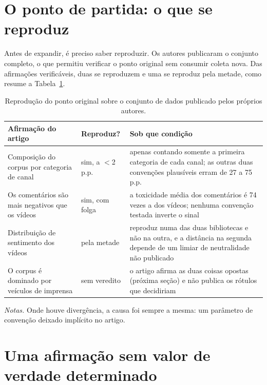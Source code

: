 \section{O ponto de partida: o que se reproduz}

Antes de expandir, é preciso saber reproduzir. Os autores publicaram o conjunto
completo, o que permitiu verificar o ponto original sem consumir coleta nova. Das
afirmações verificáveis, duas se reproduzem e uma se reproduz pela metade, como
resume a Tabela~\ref{tab:youtube-ponto}.

\begin{table}[htbp]
\centering\footnotesize
\caption[Reprodução do ponto original sobre os dados publicados pelos
autores]{Reprodução do ponto original sobre o conjunto de dados publicado pelos
próprios autores.}
\label{tab:youtube-ponto}
\begin{tabularx}{\textwidth}{@{}>{\raggedright\arraybackslash}p{4.2cm}>{\raggedright\arraybackslash}p{2.2cm}X@{}}
\toprule
Afirmação do artigo & Reproduz? & Sob que condição \\
\midrule
Composição do corpus por categoria de canal & sim, a $<$2 p.p. & apenas contando somente a primeira categoria de cada canal; as outras duas convenções plausíveis erram de 27 a 75 p.p. \\
\addlinespace[2pt]
Os comentários são mais negativos que os vídeos & sim, com folga & a toxicidade média dos comentários é 74 vezes a dos vídeos; nenhuma convenção testada inverte o sinal \\
\addlinespace[2pt]
Distribuição de sentimento dos vídeos & pela metade & reproduz numa das duas bibliotecas e não na outra, e a distância na segunda depende de um limiar de neutralidade não publicado \\
\addlinespace[2pt]
O corpus é dominado por veículos de imprensa & sem veredito & o artigo afirma as duas coisas opostas (próxima seção) e não publica os rótulos que decidiriam \\
\bottomrule
\end{tabularx}

\vspace{2pt}
{\footnotesize \textit{Notas.} Onde houve divergência, a causa foi sempre a mesma: um
parâmetro de convenção deixado implícito no artigo.\par}
\end{table}

\section{Uma afirmação sem valor de verdade determinado}

